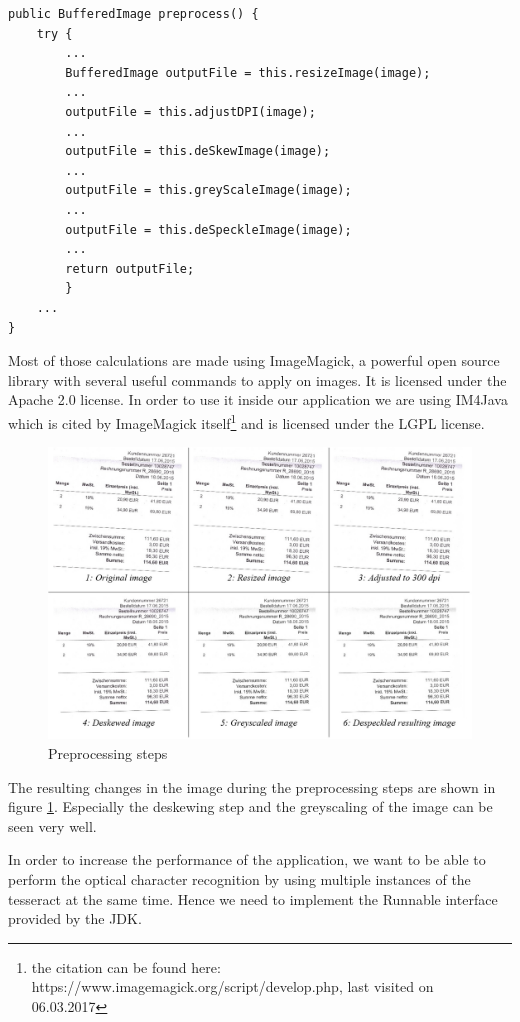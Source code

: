 \begin{lstlisting}[caption={Image preprocessing}]
public BufferedImage preprocess() {
    try {
        ...
        BufferedImage outputFile = this.resizeImage(image);
		...
        outputFile = this.adjustDPI(image);
		...
        outputFile = this.deSkewImage(image);
		...
        outputFile = this.greyScaleImage(image);
		...
        outputFile = this.deSpeckleImage(image);
		...
        return outputFile;
        } 
  	...
}
\end{lstlisting}

Most of those calculations are made using ImageMagick, a powerful open source library with several useful commands to apply on images. It is licensed under the Apache 2.0 license. In order to use it inside our application we are using IM4Java which is cited by ImageMagick itself\footnote{the citation can be found here: https://www.imagemagick.org/script/develop.php, last visited on 06.03.2017} and is licensed under the LGPL license.

\begin{figure}[htb!]
\centering
\includegraphics[width=\textwidth]{Images/OCR/PreprocessingSteps.jpg}
\caption{Preprocessing steps \label{preprocessingSteps}}
\end{figure}

The resulting changes in the image during the preprocessing steps are shown in figure \ref{preprocessingSteps}.
Especially the deskewing step and the greyscaling of the image can be seen very well.

In order to increase the performance of the application, we want to be able to perform the optical character recognition by using multiple instances of the tesseract at the same time. Hence we need to implement the Runnable interface provided by the JDK. 

